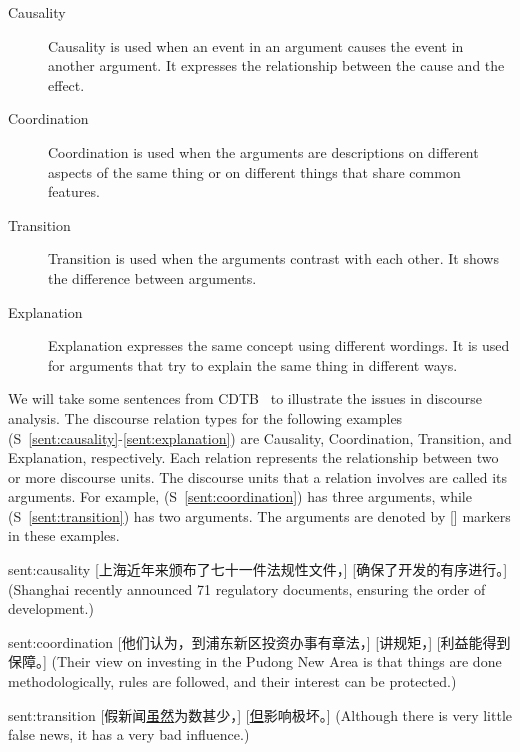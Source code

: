 \begin{description}
\item[Causality] Causality is used when an event in an argument causes the event
    in another argument. It expresses the relationship between the cause
    and the effect.
\item[Coordination] Coordination is used when the arguments are
    descriptions on different aspects of the same thing or
    on different things that share common features.
\item[Transition] Transition is used when the arguments contrast with each other.
    It shows the difference between arguments.
\item[Explanation] Explanation expresses the same concept using different wordings.
    It is used for arguments that try to explain the same thing in different
    ways.
\end{description}


We will take some sentences from CDTB~\citep{li2014building} to illustrate the issues
in discourse analysis. The discourse relation types for the following examples
(S~\ref{sent:causality}-\ref{sent:explanation}) are
Causality, Coordination, Transition, and Explanation, respectively.
Each relation represents the relationship between two or more discourse units.
The discourse units that a relation involves are called its arguments.
For example, (S~\ref{sent:coordination}) has
three arguments, while (S~\ref{sent:transition}) has two arguments. The arguments are
denoted by [] markers in these examples.

\begin{sent}{sent:causality}{}
    [上海近年来颁布了七十一件法规性文件，] [确保了开发的有序进行。]
    (Shanghai recently announced 71 regulatory documents, ensuring
    the order of development.)
\end{sent}

\begin{sent}{sent:coordination}{}
    [他们认为，到浦东新区投资办事有章法，] [讲规矩，] [利益能得到保障。]
    (Their view on investing in the Pudong New Area is that
    things are done methodologically,
    rules are followed, and their interest can be protected.)
\end{sent}

\begin{sent}{sent:transition}{}
    [假新闻\underline{虽然}为数甚少，] [\underline{但}影响极坏。]
    (Although there is very little false news, it has a very bad influence.)
\end{sent}


